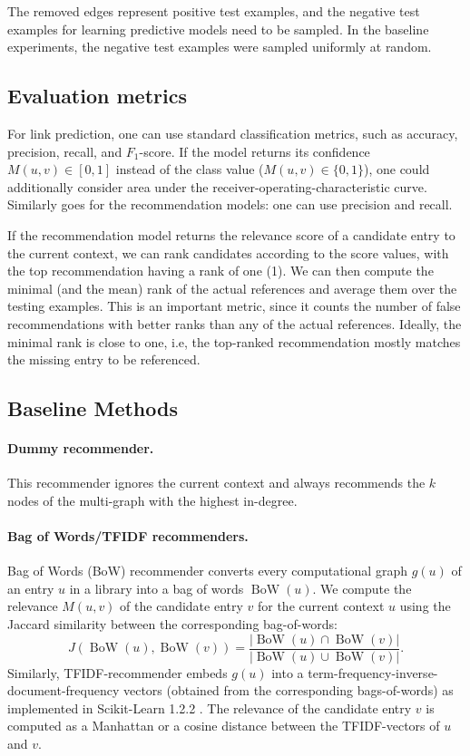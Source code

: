 \documentclass{article}
\begin{document}
The removed edges represent positive test examples, and the negative test examples for learning predictive models need to be sampled. In the baseline experiments, the negative test examples were sampled uniformly at random.

\subsection{Evaluation metrics}
For link prediction, one can use standard classification metrics, such as accuracy, precision, recall, and $F_1$-score. If the model returns its confidence $M(u, v)\in [0, 1]$ instead of the class value ($M(u, v)\in \{0, 1\}$), one could additionally consider area under the receiver-operating-characteristic curve. Similarly goes for the recommendation models: one can use precision and recall.

If the recommendation model returns the relevance score of a candidate entry to the current context, we can rank candidates according to the score values, with the top recommendation having a rank of one (1). We can then compute the minimal (and the mean) rank of the actual references and average them over the testing examples. This is an important metric, since it counts the number of false recommendations with better ranks than any of the actual references. Ideally, the minimal rank is close to one, i.e, the top-ranked recommendation mostly matches the missing entry to be referenced.

\subsection{Baseline Methods}


\paragraph{Dummy recommender.} This recommender ignores the current context and always recommends the $k$ nodes of the multi-graph with the highest in-degree.

\paragraph{Bag of Words/TFIDF recommenders.} Bag of Words (BoW) recommender converts every computational graph $g(u)$ of an entry $u$ in a library into a bag of words $\operatorname{BoW}(u)$. We compute the relevance $M(u, v)$ of the candidate entry $v$ for the current context $u$ using the Jaccard similarity between the corresponding bag-of-words:
    $$
    J(\operatorname{BoW}(u), \operatorname{BoW}(v)) = \frac{| \operatorname{BoW}(u) \cap \operatorname{BoW}(v) |}{| \operatorname{BoW}(u) \cup \operatorname{BoW}(v) |}.
    $$
Similarly, TFIDF-recommender embeds $g(u)$ into a term-frequency-inverse-document-frequency vectors (obtained from the corresponding bags-of-words) as implemented in Scikit-Learn 1.2.2 \citep{scikit-learn}. The relevance of the candidate entry $v$ is computed as a Manhattan or a cosine distance between the TFIDF-vectors of $u$ and $v$.
\end{document}
